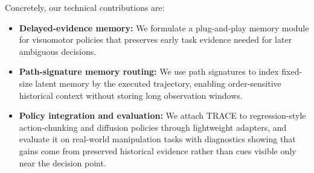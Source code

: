 \documentclass{article}
\begin{document}
Concretely, our technical contributions are:
\begin{itemize}[leftmargin=*,nosep]
    \item \textbf{Delayed-evidence memory:} We formulate a plug-and-play memory module for visuomotor policies that preserves early task evidence needed for later ambiguous decisions.
    \item \textbf{Path-signature memory routing:} We use path signatures to index fixed-size latent memory by the executed trajectory, enabling order-sensitive historical context without storing long observation windows.
    \item \textbf{Policy integration and evaluation:} We attach TRACE to regression-style action-chunking and diffusion policies through lightweight adapters, and evaluate it on real-world manipulation tasks with diagnostics showing that gains come from preserved historical evidence rather than cues visible only near the decision point.
\end{itemize}
\end{document}
